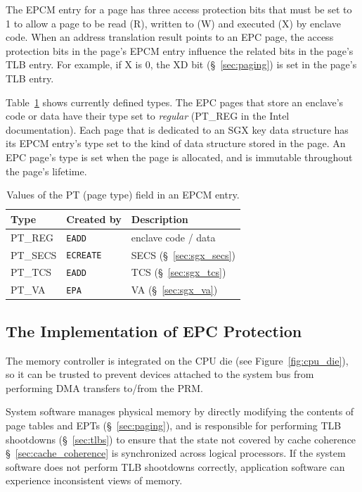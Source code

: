 
The EPCM entry for a page has three access protection bits that must be set to
1 to allow a page to be read (R), written to (W) and executed (X) by enclave
code. When an address translation result points to an EPC page, the access
protection bits in the page's EPCM entry influence the related bits in the
page's TLB entry. For example, if X is 0, the XD bit (\S~\ref{sec:paging}) is
set in the page's TLB entry.

Table~\ref{fig:sgx_pt_values} shows currently defined types. The EPC pages that
store an enclave's code or data have their type set to \textit{regular}
(PT\_REG in the Intel documentation). Each page that is dedicated to an SGX key
data structure has its EPCM entry's type set to the kind of data structure
stored in the page. An EPC page's type is set when the page is allocated, and
is immutable throughout the page's lifetime.

\begin{table}[hbt]
  \centering
  \begin{tabularx}{\columnwidth}{| l | l | X |}
  \hline
  \textbf{Type} & \textbf{Created by} & \textbf{Description}\\
  \hline
  PT\_REG & \texttt{EADD} & enclave code / data \\
  \hline
  PT\_SECS & \texttt{ECREATE} & SECS (\S~\ref{sec:sgx_secs}) \\
  \hline
  PT\_TCS & \texttt{EADD} & TCS (\S~\ref{sec:sgx_tcs}) \\
  \hline
  PT\_VA & \texttt{EPA} & VA (\S~\ref{sec:sgx_va}) \\
  \hline
  \end{tabularx}
  \caption{Values of the PT (page type) field in an EPCM entry.}
  \label{fig:sgx_pt_values}
\end{table}





\subsection {The Implementation of EPC Protection}

The memory controller is
integrated on the CPU die (see Figure~\ref{fig:cpu_die}), so it can be trusted
to prevent devices attached to the system bus from performing DMA transfers
to/from the PRM.

System software manages physical memory by directly modifying the contents of
page tables and EPTs (\S~\ref{sec:paging}), and is responsible for performing
TLB shootdowns (\S~\ref{sec:tlbs}) to ensure that the state not covered by
cache coherence \S~\ref{sec:cache_coherence} is synchronized across logical
processors. If the system software does not perform TLB shootdowns correctly,
application software can experience inconsistent views of memory.

